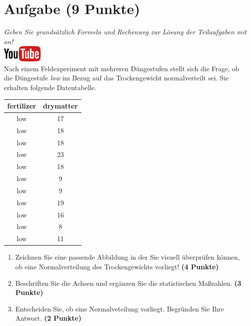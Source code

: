 \documentclass[a4paper, 10pt]{scrartcl}\usepackage[]{graphicx}\usepackage[]{xcolor}
\begin{document}
\section{Aufgabe \hfill (9 Punkte)}

\textit{Geben Sie grunds{\"a}tzlich Formeln und Rechenweg zur L{\"o}sung der
  Teilaufgaben mit an!} \\[1Ex]

\hfill\href{https://youtu.be/VX4Hs81h8_A}{\includegraphics[width =
  2cm]{img/youtube}}\\[1Ex]

Nach einem Feldexperiment mit mehreren D{\"u}ngestufen stellt sich die Frage,
ob die D{\"u}ngestufe \textit{low} im Bezug auf das Trockengewicht
normalverteilt sei. Sie erhalten folgende Datentabelle.

\begin{table}[!h]
\centering
\begin{tabular}{cc}
\toprule
fertilizer & drymatter\\
\midrule
low & 17\\
low & 18\\
low & 18\\
low & 23\\
low & 18\\
\addlinespace
low & 9\\
low & 9\\
low & 19\\
low & 16\\
low & 8\\
\addlinespace
low & 11\\
\bottomrule
\end{tabular}
\end{table}



\begin{enumerate}
\item Zeichnen Sie eine passende Abbildung in der Sie visuell {\"u}berpr{\"u}fen
  k{\"o}nnen, ob eine Normalverteilung des Trockengewichts vorliegt! \textbf{(4
    Punkte)}
\item Beschriften Sie die Achsen und erg{\"a}nzen Sie die statistischen
  Ma{\ss}zahlen. \textbf{(3 Punkte)}
\item Entscheiden Sie, ob eine Normalveteilung vorliegt. Begr{\"u}nden Sie Ihre
  Antwort. \textbf{(2 Punkte)}
\end{enumerate} 
\clearpage
\end{document}

